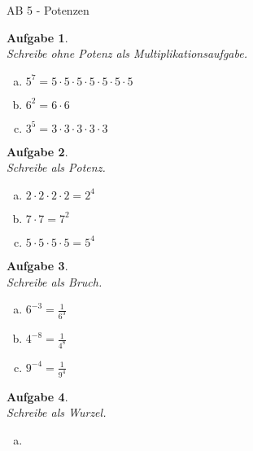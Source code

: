 \documentclass[12pt,fleqn]{article}
\theoremstyle{aufg}
\newtheorem{aufgabe}{Aufgabe}
\theoremstyle{bsp}
\begin{document}
 
    \begin{flushleft}
\begin{center}AB 5 - Potenzen\end{center}\begin{aufgabe} ~ \\ 
Schreibe ohne Potenz als Multiplikationsaufgabe. \\ 
\begin{multicols}{3} 
\begin{enumerate}[a)] 
\item 
$5^{7}=$$5\cdot5\cdot5\cdot5\cdot5\cdot5\cdot5$
\item 
$6^{2}=$$6\cdot6$
\item 
$3^{5}=$$3\cdot3\cdot3\cdot3\cdot3$
\end{enumerate} 
\end{multicols} 
\end{aufgabe} 
\begin{aufgabe} ~ \\ 
Schreibe als Potenz. \\ 
\begin{multicols}{3} 
\begin{enumerate}[a)] 
\item 
$2\cdot2\cdot2\cdot2=$$2^{4}$
\item 
$7\cdot7=$$7^{2}$
\item 
$5\cdot5\cdot5\cdot5=$$5^{4}$
\end{enumerate} 
\end{multicols} 
\end{aufgabe} 
\begin{aufgabe} ~ \\ 
Schreibe als Bruch. \\ 
\begin{multicols}{3} 
\begin{enumerate}[a)] 
\item 
$6^{-3}=$$\frac{1}{6^{3}}$
\item 
$4^{-8}=$$\frac{1}{4^{8}}$
\item 
$9^{-4}=$$\frac{1}{9^{4}}$
\end{enumerate} 
\end{multicols} 
\end{aufgabe} 
\begin{aufgabe} ~ \\ 
Schreibe als Wurzel. \\ 
\begin{multicols}{3} 
\begin{enumerate}[a)] 
\item 

\end{enumerate}
\end{multicols}
\end{aufgabe}
\end{flushleft}
\end{document}

